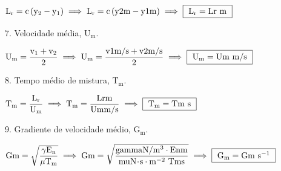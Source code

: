 \documentclass{article}
\newcommand{\myspace}{0.2cm}
\begin{document}
\begin{center}
	$
		\mathrm
		{
			L_{r} = c\left ( y_{2} - y_{1} \right)
		} 
		\implies
		\mathrm
		{
			L_{r} = {{c}}\left ( {{y2}}m - {{y1}}m \right)
		}
		\implies 
		\fbox
		{ 
			$\mathrm
			{
				L_{r}= {{Lr}} \ m
			}$
		}
	$  
\end{center}
\vspace{\myspace}


7. Velocidade média, $\mathrm{ U_{m} }$.
\begin{center}
	$ 
		\mathrm
		{ 
			U_{m} = \dfrac{ v_{1} + v_{2} }{2}
		} 
		\implies
		\mathrm
		{
			U_{m} = \dfrac{ {{v1}}m/s + {{v2}}m/s }{2}
		} 
		\implies
		\fbox
		{ 
			$\mathrm{ U_{m} = {{Um}} \ m/s}$
		} 
	$ 
\end{center}
\vspace{\myspace}

8. Tempo médio de mistura, $\mathrm{ T_{m} }$.
\vspace{\myspace}
\begin{center}
	$
		\mathrm
		{
			T_{m} = \dfrac{ L_{r} }{ U_{m} } 
		} 
		\implies
		\mathrm
		{
			T_{m} = \dfrac{ {{Lr}}m }{ {{Um}}m/s } 
		}
		\implies 
		\fbox
		{ 
			$\mathrm
			{
				T_{m}= {{Tm}} \ s
			}$
		}
	$  
\end{center}
\vspace{\myspace}

9. Gradiente de velocidade médio, $\mathrm{ G_{m} }$.
\vspace{\myspace}
\begin{center}
	$
		\mathrm
		{
			Gm = \sqrt{ \dfrac{ \gamma E_{n} }{ \mu T_{m} } }
		} 
		\implies
		\mathrm
		{
			Gm = \sqrt{\dfrac{ {{gamma}} N/m^{3} \cdot {{En}}m }{ {{mu}}N \! \cdot \! s \cdot m^{-2} \ {{Tm}}s } }
		}
		\implies 
		\fbox
		{ 
			$\mathrm
			{
				G_{m} = {{Gm}} \ s^{-1}
			}$
		}
	$  
\end{center}
\end{document}
